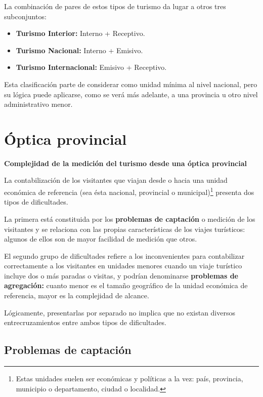 \documentclass[
]{book}
\begin{document}
La combinación de pares de estos tipos de turismo da lugar a otros tres subconjuntos:

\begin{itemize}
\item
  \textbf{Turismo Interior:} Interno + Receptivo.
\item
  \textbf{Turismo Nacional:} Interno + Emisivo.
\item
  \textbf{Turismo Internacional:} Emisivo + Receptivo.
\end{itemize}

Esta clasificación parte de considerar como unidad mínima al nivel nacional, pero su lógica puede aplicarse, como se verá más adelante, a una provincia u otro nivel administrativo menor.

\hypertarget{uxf3ptica-provincial}{%
\section{Óptica provincial}\label{uxf3ptica-provincial}}

\textbf{Complejidad de la medición del turismo desde una óptica provincial}

La contabilización de los visitantes que viajan desde o hacia una unidad económica de referencia (sea ésta nacional, provincial o municipal)\footnote{Estas unidades suelen ser económicas y políticas a la vez: país, provincia, municipio o departamento, ciudad o localidad.} presenta dos tipos de dificultades.

La primera está constituida por los \textbf{problemas de captación} o medición de los visitantes y se relaciona con las propias características de los viajes turísticos: algunos de ellos son de mayor facilidad de medición que otros.

El segundo grupo de dificultades refiere a los inconvenientes para contabilizar correctamente a los visitantes en unidades menores cuando un viaje turístico incluye dos o más paradas o visitas, y podrían denominarse \textbf{problemas de agregación:} cuanto menor es el tamaño geográfico de la unidad económica de referencia, mayor es la complejidad de alcance.

Lógicamente, presentarlas por separado no implica que no existan diversos entrecruzamientos entre ambos tipos de dificultades.

\hypertarget{problemas-de-captaciuxf3n}{%
\subsection{Problemas de captación}\label{problemas-de-captaciuxf3n}}
\end{document}
